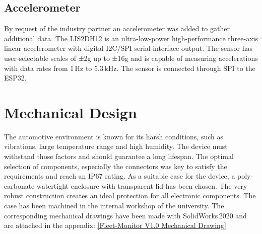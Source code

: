 \subsection{Accelerometer}
By request of the industry partner an accelerometer was added to gather additional data. The LIS2DH12 is an ultra-low-power high-performance three-axis linear accelerometer with digital I2C/SPI serial interface output. The sensor has user-selectable scales of ±2g up to ±16g and is capable of measuring accelerations with data rates from 1\,Hz to 5.3\,kHz. The sensor is connected through SPI to the ESP32.

\newpage
\section{Mechanical Design}
The automotive environment is known for its harsh conditions, such as vibrations, large temperature range and high humidity. The device must withstand those factors and should guarantee a long lifespan. The optimal selection of components, especially the connectors was key to satisfy the requirements and reach an IP67 rating.\newline
As a suitable case for the device, a poly-carbonate watertight enclosure with transparent lid has been chosen. The very robust construction creates an ideal protection for all electronic components.\newline
The case has been machined in the internal workshop of the university. The corresponding mechanical drawings have been made with SolidWorks\,2020 and are attached in the appendix: \ref{Fleet-Monitor V1.0 Mechanical Drawing}

